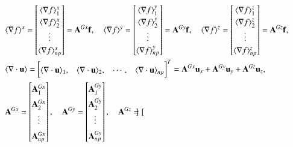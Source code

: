 \documentclass[final,3p,times]{elsarticle}
\begin{document}
 \begin{align}\renewcommand{\arraystretch}{1.2}
&\langle \nabla f \rangle^x= \renewcommand{\arraystretch}{1.2}
\begin{bmatrix}
\langle \nabla f \rangle^x_1\\\langle \nabla f \rangle^x_2\\\vdots\\\langle \nabla f \rangle^x_{np}
\end{bmatrix}=\mathbf{A}^{Gx}\mathbf{f},\quad
\langle \nabla f \rangle^y= \renewcommand{\arraystretch}{1.2}
\begin{bmatrix}
\langle \nabla f \rangle^y_1\\\langle \nabla f \rangle^y_2\\\vdots\\\langle \nabla f \rangle^y_{np}
\end{bmatrix}=\mathbf{A}^{Gy}\mathbf{f},\quad
\langle \nabla f \rangle^z= \renewcommand{\arraystretch}{1.2}
\begin{bmatrix}
\langle \nabla f \rangle^z_1\\\langle \nabla f \rangle^z_2\\\vdots\\\langle \nabla f \rangle^z_{np}
\end{bmatrix}=\mathbf{A}^{Gz}\mathbf{f},\label{eq:grad_op}\\
&\langle \nabla \cdot \mathbf{u} \rangle=  \begin{bmatrix}
\langle \nabla \cdot \mathbf{u}\rangle_1,&\langle \nabla \cdot \mathbf{u} \rangle_2,&\cdots,&\langle \nabla \cdot \mathbf{u} \rangle_{np}
\end{bmatrix}^T= 
\mathbf{A}^{Gx} \mathbf{u}_x+
\mathbf{A}^{Gy} \mathbf{u}_y+
\mathbf{A}^{Gz} \mathbf{u}_z, \label{eq:Divergence_discretized}\\
&\mathbf{A}^{Gx}= \renewcommand*{\arraystretch}{1.5}
\begin{bmatrix}\mathbf{A}^{Gx}_1\\\mathbf{A}^{Gx}_2\\\vdots\\\mathbf{A}^{Gx}_{np}
\end{bmatrix},\quad
\mathbf{A}^{Gy}= \begin{bmatrix}
\mathbf{A}^{Gy}_1\\\mathbf{A}^{Gy}_2\\\vdots\\\mathbf{A}^{Gy}_{np}
\end{bmatrix},\quad
\mathbf{A}^{Gz}= \begin{bmatrix}

\end{bmatrix}
\end{align}
\end{document}
